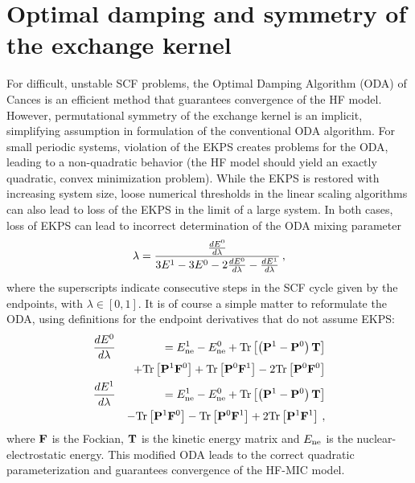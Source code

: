 \documentclass[prb,aps,nobibnotes,twocolumn,doublespace,twocolumngrid,superbib,showpacs]{revtex4}
\begin{document}
\section{Optimal damping and symmetry of the exchange kernel}

For difficult, unstable SCF problems, the Optimal Damping Algorithm (ODA) of Cances \cite{ECances00} is
an efficient method that guarantees convergence of the HF model.  
However,  permutational symmetry of the exchange kernel is an implicit, simplifying assumption in formulation
of the conventional ODA algorithm.   For small periodic systems, violation of the EKPS creates problems
for the ODA, leading to a non-quadratic behavior (the HF model should yield an exactly quadratic, convex 
minimization problem).   While the EKPS is restored with increasing system size, loose numerical thresholds
in the linear scaling algorithms can also lead to loss of the EKPS in the limit of a large system.  
In both cases, loss of EKPS can lead to incorrect determination of the ODA mixing parameter
%
\begin{eqnarray}
\lambda = {{\frac{d E^0}{d \lambda}} \over {3E^1-3E^0-2{\frac{d E^0}{d \lambda}}-{\frac{d E^1}{d \lambda}}}} \, ,
\end{eqnarray}
%
where the superscripts indicate consecutive steps in the SCF cycle given by the endpoints, 
with $\lambda \in [0,1]$.   It is of course a simple matter to reformulate the ODA, using definitions 
for the endpoint derivatives that do not assume EKPS:
\begin{eqnarray}
\frac{d E^0}{d \lambda} &&=  E^{1}_{\rm ne}-E^{0}_{\rm ne}  
+{\rm Tr}\left[\left( {\bf P}^1 - {\bf P}^0 \right) {\bf T}  \right]\nonumber\\
&& +{\rm Tr}\left[ {\bf P}^1 {\bf F}^0 \right] 
   +{\rm Tr}\left[ {\bf P}^0 {\bf F}^1 \right] 
   -2 {\rm Tr}\left[ {\bf P}^0 {\bf F}^0 \right] \nonumber\\
\frac{d E^1}{d \lambda} &&=  E^{1}_{\rm ne}-E^{0}_{\rm ne}  
+{\rm Tr}\left[\left( {\bf P}^1 - {\bf P}^0 \right) {\bf T}  \right]\nonumber\\
&& -{\rm Tr}\left[ {\bf P}^1 {\bf F}^0 \right] 
   -{\rm Tr}\left[ {\bf P}^0 {\bf F}^1 \right] 
   +2 {\rm Tr}\left[ {\bf P}^1 {\bf F}^1 \right] \, , \nonumber\\
\end{eqnarray}
where  ${\bf F}$ is the Fockian, $\bf T$ is the kinetic energy matrix  and $E_{\rm ne}$ is the nuclear-electrostatic energy.
This  modified ODA leads to the correct quadratic parameterization and guarantees convergence of the HF-MIC model.  
\end{document}
